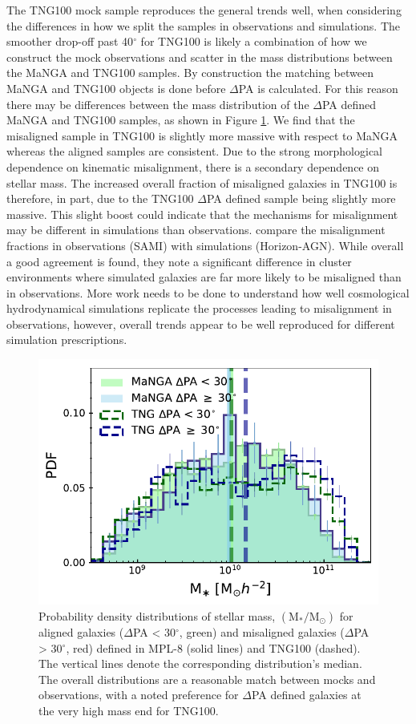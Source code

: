 The TNG100 mock sample reproduces the general trends well, when considering the differences in how we split the samples in observations and simulations. The smoother drop-off past 40$^{\circ}$ for TNG100 is likely a combination of how we construct the mock observations and scatter in the mass distributions between the MaNGA and TNG100 samples. By construction the matching between MaNGA and TNG100 objects is done before $\Delta$PA is calculated. For this reason there may be differences between the mass distribution of the $\Delta$PA defined MaNGA and TNG100 samples, as shown in Figure \ref{fig:TNG_mpl8_stelM}. We find that the misaligned sample in TNG100 is slightly more massive with respect to MaNGA whereas the aligned samples are consistent. Due to the strong morphological dependence on kinematic misalignment, there is a secondary dependence on stellar mass. The increased overall fraction of misaligned galaxies in TNG100 is therefore, in part, due to the TNG100 $\Delta$PA defined sample being slightly more massive. This slight boost could indicate that the mechanisms for misalignment may be different in simulations than observations. \citet{khim2019} compare the misalignment fractions in observations (SAMI) with simulations (Horizon-AGN). While overall a good agreement is found, they note a significant difference in cluster environments where simulated galaxies are far more likely to be misaligned than in observations. More work needs to be done to understand how well cosmological hydrodynamical simulations replicate the processes leading to misalignment in observations, however, overall trends appear to be well reproduced for different simulation prescriptions.

\begin{figure}
    \centering
	\includegraphics[width=0.85\linewidth]{misalignment_TNG/delPA_split_stelM_tng_comparison.pdf}
    \caption{Probability density distributions of stellar mass, $\mathrm{(M_{\ast}/M_{\odot})}$ for aligned galaxies ($\Delta$PA < 30$^{\circ}$, green) and misaligned galaxies ($\Delta$PA > 30$^{\circ}$, red) defined in MPL-8 (solid lines) and TNG100 (dashed). The vertical lines denote the corresponding distribution's median. The overall distributions are a reasonable match between mocks and observations, with a noted preference for $\Delta$PA defined galaxies at the very high mass end for TNG100. }
    \label{fig:TNG_mpl8_stelM}
\end{figure}

